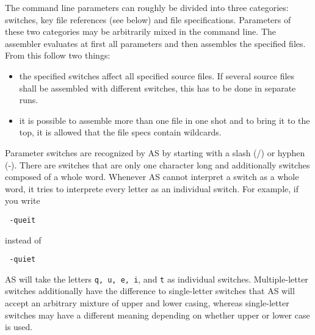 \documentclass[12pt,twoside]{report}
\newcommand{\tty}[1]{{\tt #1}}
\begin{document}
The command line parameters can roughly be divided into three categories:
switches, key file references (see below) and file specifications. 
Parameters of these two categories may be arbitrarily mixed in the command
line.  The assembler evaluates at first all parameters and then assembles
the specified files.  From this follow two things:
\begin{itemize}
\item{the specified switches affect all specified source files. If 
      several source files shall be assembled with different switches,
      this has to be done in separate runs.}
\item{it is possible to assemble more than one file in one shot and to 
      bring it to the top, it is allowed that the file specs contain 
      wildcards.}
\end{itemize}
Parameter switches are recognized by AS by starting with 
a slash (/) or hyphen (-).  There are switches that are only one
character long and additionally switches composed of a whole word. 
Whenever AS cannot interpret a switch as a whole word, it tries to
interprete every letter as an individual switch.  For example, if you
write 
\begin{verbatim}
 -queit
\end{verbatim}
instead of
\begin{verbatim}
 -quiet
\end{verbatim}
AS will take the letters \tty{q, u, e, i}, and \tty{t} as individual
switches.  Multiple-letter switches additionally have the difference to
single-letter switches that AS will accept an arbitrary mixture of upper
and lower casing, whereas single-letter switches may have a different
meaning depending on whether upper or lower case is used.
\end{document}
